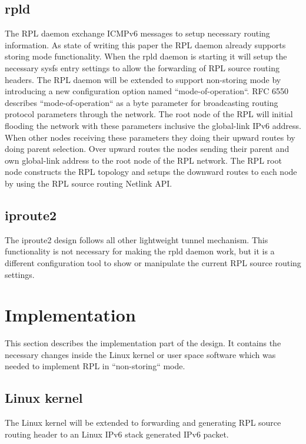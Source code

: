 \documentclass[letterpaper]{article}
\begin{document}
\subsection{rpld}

The RPL daemon exchange ICMPv6 messages to setup necessary routing information.
As state of writing this paper the RPL daemon already supports storing mode functionality.
When the rpld daemon is starting it will setup the necessary sysfs entry settings to allow the forwarding of RPL source routing headers.
The RPL daemon will be extended to support non-storing mode by introducing a new configuration option named ``mode-of-operation``.
RFC 6550 describes ``mode-of-operation`` as a byte parameter for broadcasting routing protocol parameters through the network.
The root node of the RPL will initial flooding the network with these parameters inclusive the global-link IPv6 address.
When other nodes receiving these parameters they doing their upward routes by doing parent selection.
Over upward routes the nodes sending their parent and own global-link address to the root node of the RPL network.
The RPL root node constructs the RPL topology and setups the downward routes to each node by using the RPL source routing Netlink API.

\subsection{iproute2}

The iproute2 design follows all other lightweight tunnel mechanism.
This functionality is not necessary for making the rpld daemon work, but it is a different configuration tool to show or manipulate the current RPL source routing settings.

\section{Implementation}

This section describes the implementation part of the design. It contains the necessary changes inside the Linux kernel or user space software which was needed to implement RPL in ``non-storing`` mode.

\subsection{Linux kernel}

The Linux kernel will be extended to forwarding and generating RPL source routing header to an Linux IPv6 stack generated IPv6 packet.
\end{document}
